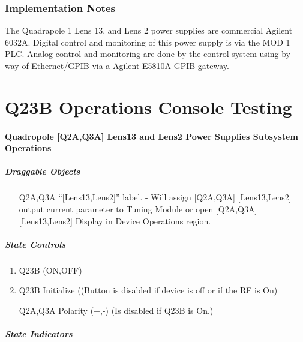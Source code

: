 \documentclass[11pt]{book}		%
\begin{document}
\subsection{Implementation Notes} \label{sect:cyc-equip-ctl-beamline-Q23B-implementation}

The Quadrapole 1 Lens 13, and Lens 2 power supplies are commercial Agilent 6032A.  Digital control and monitoring of this power supply is via the MOD 1 PLC.  Analog control and monitoring are done by the control system using by way of Ethernet/GPIB via a Agilent E5810A GPIB gateway.




\chapter{Q23B Operations Console Testing}

\subsubsection{Quadropole [Q2A,Q3A] Lens13 and Lens2 Power Supplies Subsystem Operations}\label{sect:cyc-op-interface-ops-terminal-subsys-ops-mainline-Q23B}

\paragraph{Draggable Objects}

\begin{enumerate}
 \item [Q2A,Q3A] ``[Lens13,Lens2]'' label. - Will assign [Q2A,Q3A] [Lens13,Lens2] output current parameter to Tuning Module or open [Q2A,Q3A] [Lens13,Lens2] Display in Device Operations region.
\end{enumerate}

\paragraph{State Controls}

\begin{enumerate}
 \item Q23B (ON,OFF)
 \item Q23B Initialize ((Button is disabled if device is off or if the RF is On)
 \item [Q2A,Q3A] Polarity (+,-) (Is disabled if Q23B is On.)
\end{enumerate}

\paragraph{State Indicators}
\end{document}
